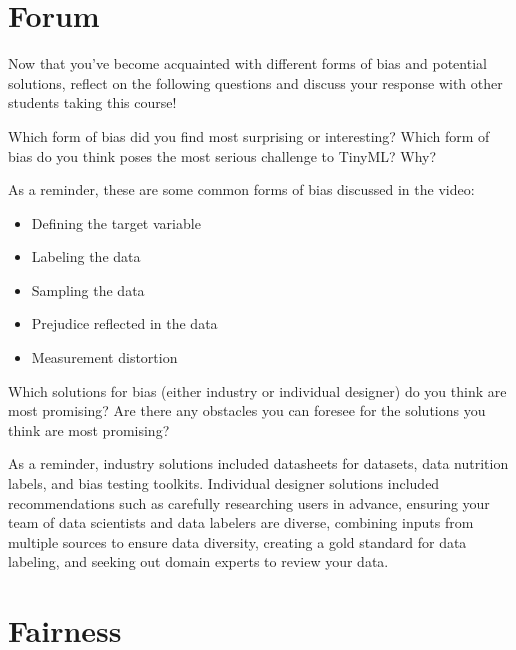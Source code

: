 \section{Forum}

Now that you’ve become acquainted with different forms of bias and potential solutions, reflect on the following questions and discuss your response with other students taking this course!

Which form of bias did you find most surprising or interesting? Which form of bias do you think poses the most serious challenge to TinyML? Why? 

As a reminder, these are some common forms of bias discussed in the video:

\begin{itemize}
 \item Defining the target variable
 \item Labeling the data
 \item Sampling the data
 \item Prejudice reflected in the data
 \item Measurement distortion
\end{itemize}

Which solutions for bias (either industry or individual designer) do you think are most promising? Are there any obstacles you can foresee for the solutions you think are most promising? 

As a reminder, industry solutions included datasheets for datasets, data nutrition labels, and bias testing toolkits. Individual designer solutions included recommendations such as carefully researching users in advance, ensuring your team of data scientists and data labelers are diverse, combining inputs from multiple sources to ensure data diversity, creating a gold standard for data labeling, and seeking out domain experts to review your data.

\section{Fairness}

